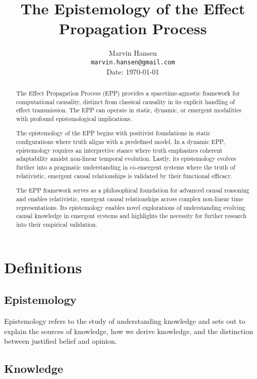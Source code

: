 \documentclass{article}
\title{The Epistemology of the Effect Propagation Process}
\author{
  Marvin Hansen \\
  \texttt{marvin.hansen@gmail.com} \\
   Date: \today
}
\begin{document}
\maketitle

\begin{abstract}
The Effect Propagation Process (EPP) provides a spacetime-agnostic framework for computational causality, distinct from classical causality in its explicit handling of effect transmission. The EPP can operate in static, dynamic, or emergent modalities with profound epistemological implications.


The epistemology of the EPP begins with positivist foundations in static configurations where truth aligns with a predefined model. In a dynamic EPP, epistemology requires an interpretive stance where truth emphasizes coherent adaptability amidst non-linear temporal evolution. Lastly, its epistemology evolves further into a pragmatic understanding in co-emergent systems where the truth of relativistic, emergent causal relationships is validated by their functional efficacy.


The EPP framework serves as a philosophical foundation for advanced causal reasoning and enables relativistic, emergent causal relationships across complex non-linear time representations. Its epistemology enables novel explorations of understanding evolving causal knowledge in emergent systems and highlights the necessity for further research into their empirical validation.
\end{abstract}

\section{Definitions}
\label{sec:Definitions}

\subsection{Epistemology}
\label{subsec:Def_Epistemology}

Epistemology refers to the study of understanding knowledge and sets out to explain the sources of knowledge, how we derive knowledge, and the distinction between justified belief and opinion.

\subsection{Knowledge}
\label{subsec:Def_Knowledge}
\end{document}
